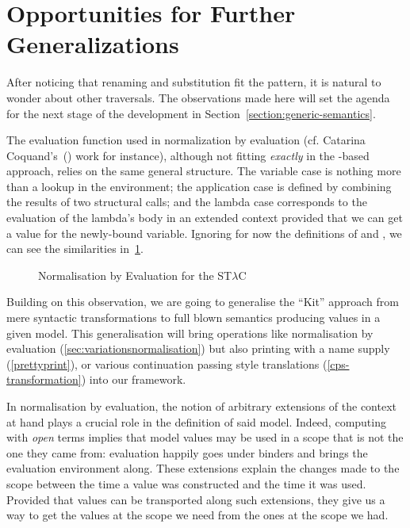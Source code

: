 \section{Opportunities for Further Generalizations}

After noticing that renaming and substitution fit the pattern, it is
natural to wonder about other traversals. The observations made here
will set the agenda for the next stage of the development in
Section~\ref{section:generic-semantics}.

The evaluation function used in normalization by evaluation
(cf. Catarina Coquand's~(\citeyear{coquand2002formalised}) work
for instance), although
not fitting \emph{exactly} in the -based approach, relies on
the same general structure. The variable case is nothing more than a
lookup in the environment; the application case is defined by combining
the results of two structural calls; and the lambda case corresponds to
the evaluation of the lambda's body in an extended context provided that
we can get a value for the newly-bound variable. Ignoring for now the
definitions of  and , we can see the similarities
in~\cref{nbe}.

\begin{figure}[h]
\caption{Normalisation by Evaluation for the ST$λ$C\label{nbe}}
\end{figure}

Building on this observation, we are going to generalise the ``Kit''
approach from mere syntactic transformations to full blown semantics
producing values in a given model. This generalisation will bring
operations like
normalisation by evaluation (\cref{sec:variationsnormalisation})
but also printing with a name supply (\cref{prettyprint}),
or various continuation passing style translations (\cref{cps-transformation})
into our framework.

In normalisation by evaluation, the notion of arbitrary extensions of
the context at hand plays a crucial role in the definition of said model.
Indeed, computing with \emph{open} terms implies that model values may be
used in a scope that is not the one they came from: evaluation happily goes
under binders and brings the evaluation environment along.
%
These extensions explain the changes made to the scope between the time a
value was constructed and the time it was used. Provided that values can be
transported along such extensions, they give us a way to get the values at
the scope we need from the ones at the scope we had.

